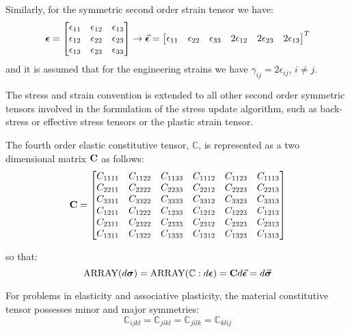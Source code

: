 \begin{appendices}
\noindent Similarly, for the symmetric second order strain tensor we have:
\begin{equation*}
	\boldsymbol{\epsilon} = \begin{bmatrix}
		\epsilon_{11} & \epsilon_{12} & \epsilon_{13} \\
		\epsilon_{12} & \epsilon_{22} & \epsilon_{23} \\
		\epsilon_{13} & \epsilon_{23} & \epsilon_{33} \\
	\end{bmatrix}\rightarrow \vec{\bm{\epsilon}} = \begin{bmatrix}
		\epsilon_{11} & \epsilon_{22} & \epsilon_{33} & 2\epsilon_{12} & 
		2\epsilon_{23} & 
		2\epsilon_{13}
	\end{bmatrix}^T
\end{equation*}
and it is assumed that for the engineering strains we have 
$\gamma_{ij}=2\epsilon_{ij}$, $i\neq j$.

The stress and strain convention is extended to all other second order 
symmetric tensors involved in the formulation of the stress update algorithm, 
such as back-stress or effective stress tensors or the plastic strain tensor.

The fourth order elastic constitutive tensor, $\mathbb{C}$, is represented as a 
two dimensional matrix $\mathbf{C}$ as follows:
\begin{equation*}
	\mathbf{C} = \begin{bmatrix}
		C_{1111} & C_{1122} & C_{1133} & C_{1112} & C_{1123} & C_{1113}\\
		C_{2211} & C_{2222} & C_{2233} & C_{2212} & C_{2223} & C_{2213}\\
		C_{3311} & C_{3322} & C_{3333} & C_{3312} & C_{3323} & C_{3313}\\
		C_{1211} & C_{1222} & C_{1233} & C_{1212} & C_{1223} & C_{1213}\\
		C_{2311} & C_{2322} & C_{2333} & C_{2312} & C_{2323} & C_{2313}\\
		C_{1311} & C_{1322} & C_{1333} & C_{1312} & C_{1323} & C_{1313}
	\end{bmatrix}
\end{equation*}

so that:
\begin{equation*}
	\text{ARRAY}(d\bm{\sigma})=\text{ARRAY}(\mathbb{C}:d\bm{\epsilon})=
	\mathbf{C}d\vec{\bm{\epsilon}} =d\vec{\bm{\sigma}}
\end{equation*}

For problems in elasticity and associative plasticity, the material 
constitutive tensor possesses minor and major symmetries:
$$\mathbb{C}_{ijkl}=\mathbb{C}_{jikl}=\mathbb{C}_{jilk}=\mathbb{C}_{klij}$$


\end{appendices}
